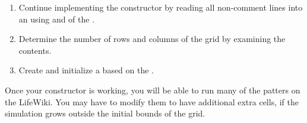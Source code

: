 \begin{exercise}
\begin{enumerate}
\item Continue implementing the constructor by reading all non-comment lines into an  using  and  of the .

\item Determine the number of rows and columns of the grid by examining the  contents.

\item Create and initialize a  based on the .

\end{enumerate}

Once your constructor is working, you will be able to run many of the patters on the LifeWiki.
You may have to modify them to have additional extra cells, if the simulation grows outside the initial bounds of the grid.

\end{exercise}


